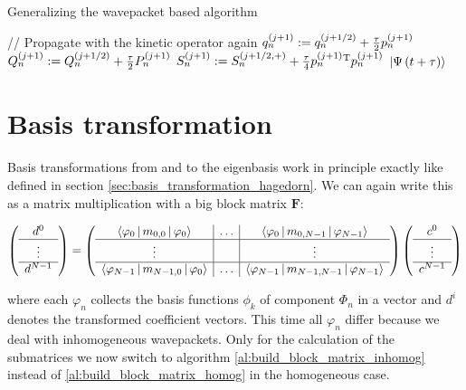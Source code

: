 \begin{chapter}{Generalizing the wavepacket based algorithm}
\begin{algorithm}
\begin{algorithmic}
  \STATE // Propagate with the kinetic operator again
    \STATE $q_n^{\left(j+1\right)} := q_n^{\left(j+1/2\right)} + \frac{\tau}{2} p_n^{\left(j+1\right)}$
    \STATE $Q_n^{\left(j+1\right)} := Q_n^{\left(j+1/2\right)} + \frac{\tau}{2} P_n^{\left(j+1\right)}$
    \STATE $S_n^{\left(j+1\right)} := S_n^{\left(j+1/2,+\right)} + \frac{\tau}{4} p_n^{\left(j+1\right)}{}^{\textnormal{T}} p_n^{\left(j+1\right)}$
  \ENDFOR
  \RETURN $\Ket{\Psi\left( t+\tau \right)}$
\end{algorithmic}
\end{algorithm}

\section{Basis transformation}
\label{sec:basis_transformation_hagedorn_inhomog}

Basis transformations from and to the eigenbasis work in principle exactly like
defined in section \ref{sec:basis_transformation_hagedorn}. We can again write
this as a matrix multiplication with a big block matrix $\mathbf{F}$:

\begin{equation*}
  \left(\begin{array}{c}
    d^0 \\
    \hline
    \vdots \\
    \hline
    d^{N-1}
  \end{array}\right)
  =
  \left(
  \begin{array}{c|c|c}
    \Braket{\varphi_0|m_{0,0}|\varphi_0} & \hdots & \Braket{\varphi_0|m_{0,N-1}|\varphi_{N-1}} \\
    \hline
    \vdots & {} & \vdots \\
    \hline
    \Braket{\varphi_{N-1}|m_{N-1,0}|\varphi_0} & \hdots & \Braket{\varphi_{N-1}|m_{N-1,N-1}|\varphi_{N-1}} \\
  \end{array}\right)
  \left(\begin{array}{c}
    c^0 \\
    \hline
    \vdots \\
    \hline
    c^{N-1}
  \end{array}\right)
\end{equation*}

where each $\varphi_n$ collects the basis functions $\phi_k$ of component $\Phi_n$
in a vector and $d^i$ denotes the transformed coefficient vectors. This time all $\varphi_n$ differ because we deal with inhomogeneous
wavepackets. Only for the calculation of the submatrices we now switch to algorithm
\ref{al:build_block_matrix_inhomog} instead of \ref{al:build_block_matrix_homog}
in the homogeneous case.


\end{chapter}
